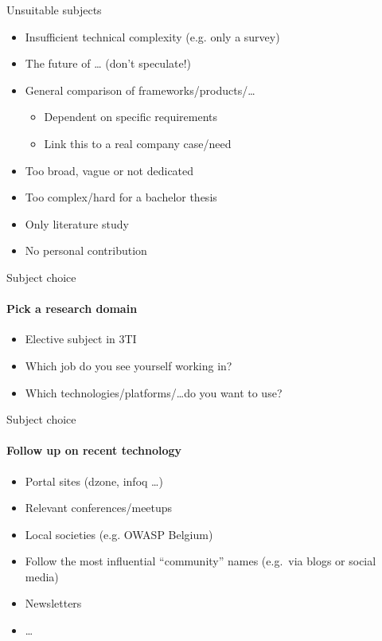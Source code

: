 \documentclass[aspectratio=169]{beamer}
\begin{document}
    \begin{frame}{Unsuitable subjects}
        
        \begin{itemize}
            \item Insufficient technical complexity (e.g. only a survey)
            \item The future of \ldots{} (don't speculate!)
            \item General comparison of frameworks/products/\ldots
            \begin{itemize}
                \item Dependent on specific requirements
                \item Link this to a real company case/need
            \end{itemize}
            \item Too broad, vague or not dedicated
            \item Too complex/hard for a bachelor thesis
            \item Only literature study
            \item No personal contribution
        \end{itemize}
        
    \end{frame}
    
    \begin{frame}{Subject choice}
        \framesubtitle{Pick a research domain}
        
        \begin{itemize}
            \item Elective subject in 3TI
            \item Which job do you see yourself working in?
            \item Which technologies/platforms/\ldots  do you want to use?
        \end{itemize}
        
    \end{frame}
    
    \begin{frame}{Subject choice}
        \framesubtitle{Follow up on recent technology}
        
        \begin{itemize}
            \item Portal sites (dzone, infoq \ldots)
            \item Relevant conferences/meetups
            \item Local societies (e.g. OWASP Belgium)
            \item Follow the most influential ``community'' names (e.g.\ via blogs or social media)            
            \item Newsletters
            \item \ldots
        \end{itemize}
        
    \end{frame}
    
\end{document}

